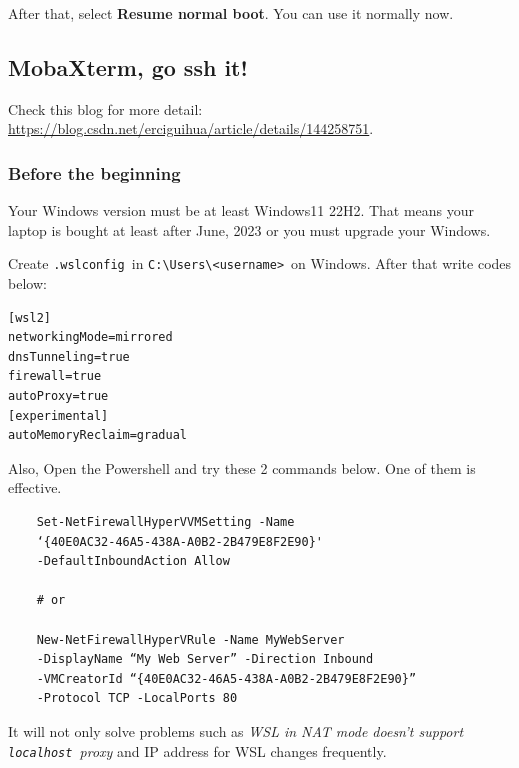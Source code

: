 \documentclass[12pt]{ctexart}
\newenvironment{mdquote}
{%
  \par\noindent
  \begin{list}{}{%
      \setlength{\leftmargin}{1em}%
      \setlength{\rightmargin}{0pt}%
      \setlength{\itemindent}{0pt}%
      \setlength{\listparindent}{\parindent}%
      \setlength{\topsep}{0.5\baselineskip}%
  }
  \item[\textbf{>}\ ]\itshape
}
{\end{list}\par}
\begin{document}
After that, select \textbf{Resume normal boot}. You can use it normally
now.

\newpage
\subsection{\textbf{MobaXterm, go ssh it!}}

\begin{mdquote}
Check this blog for more detail:
\url{https://blog.csdn.net/erciguihua/article/details/144258751}.
\end{mdquote}

\subsubsection{\textbf{Before the beginning}}

\begin{mdquote}
Your Windows version must be at least Windows11 22H2. That means your
laptop is bought at least after June, 2023 or you must upgrade your
Windows.
\end{mdquote}

Create \texttt{.wslconfig}\ in
\texttt{C:\textbackslash{}Users\textbackslash{}\textless{}username\textgreater{}}\
on Windows. After that write codes below:

\begin{adjustwidth}{2em}{0pt}
\begin{verbatim}
[wsl2]
networkingMode=mirrored
dnsTunneling=true
firewall=true
autoProxy=true
[experimental]
autoMemoryReclaim=gradual
\end{verbatim}
\end{adjustwidth}

Also, Open the Powershell and try these 2 commands below. One of them is
effective.

\begin{verbatim}
    Set-NetFirewallHyperVVMSetting -Name 
    ‘{40E0AC32-46A5-438A-A0B2-2B479E8F2E90}' 
    -DefaultInboundAction Allow

    # or

    New-NetFirewallHyperVRule -Name MyWebServer 
    -DisplayName “My Web Server” -Direction Inbound 
    -VMCreatorId “{40E0AC32-46A5-438A-A0B2-2B479E8F2E90}”
    -Protocol TCP -LocalPorts 80
\end{verbatim}

It will not only solve problems such as \emph{WSL in NAT mode
doesn't support \texttt{localhost}\ proxy} and IP address
for WSL changes frequently.
\end{document}
